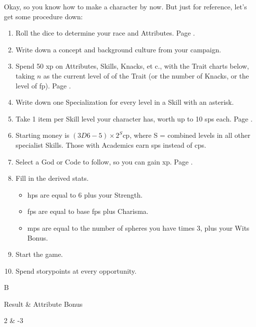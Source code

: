 \begin{multicols}{2}

\noindent
Okay, so you know how to make a character by now.  But just for reference, let's get some procedure down:

\begin{enumerate}
	\item
	Roll the dice to determine your race and Attributes.  Page \pageref{character_rolls}.
	\item
	Write down a concept and background culture from your campaign.
	\item
	Spend 50 \gls{xp} on Attributes, Skills, Knacks, et c., with the Trait charts below, taking $n$ as the current level of of the Trait (or the number of Knacks, or the level of \gls{fp}).
	Page \pageref{xp}.
	\item
	Write down one Specialization for every level in a Skill with an asterisk.
	\item
	Take 1 item per Skill level your character has, worth up to 10 \glspl{sp} each.  Page \pageref{start_equipment}.
	\item
	Starting money is $(3D6-5)\times 2^S$\gls{cp}, where S = combined levels in all other specialist Skills. Those with Academics earn \glspl{sp} instead of \glspl{cp}.
	\item
	Select a God or Code to follow, so you can gain \gls{xp}.  Page \pageref{gods_codes}.
	\item
	Fill in the derived stats.
	\begin{itemize}

		\item
		\glspl{hp} are equal to 6 plus your Strength.
		\item
		\glspl{fp} are equal to base \glspl{fp} plus Charisma.
		\item
		\glspl{mp} are equal to the number of spheres you have times 3, plus your Wits Bonus.

	\end{itemize}
	\item
	Start the game.
	\item
	Spend \glspl{storypoint} at every opportunity.
\end{enumerate}

\columnbreak

\begin{xpbox}{B}

	Result & Attribute Bonus \\\hline

	2 & -3 \\


\end{xpbox}
\end{multicols}
